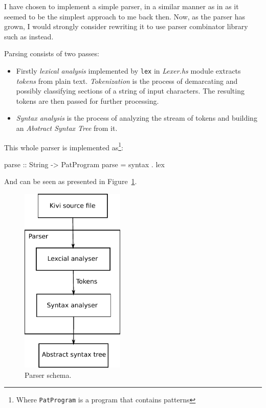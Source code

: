 \documentclass[12pt,a4paper]{report}
\begin{document}
I have chosen to implement a simple parser, in a similar manner as in
\cite{JonLes00} as it seemed to be the simplest approach to me back then. Now, as
the parser has grown, I would strongly consider rewriting it to use parser
combinator library such as \cite{website:parsec} instead.

Parsing consists of two passes:

\begin{itemize}
  \item Firstly \textit{lexical analysis} implemented by \texttt{lex} in
    \textit{Lexer.hs} module extracts \textit{tokens} from plain text.
    \textit{Tokenization} is the process of demarcating and possibly
    classifying sections of a string of input characters. The resulting tokens
    are then passed for further processing.
  \item \textit{Syntax analysis} is the process of analyzing the stream of
    tokens and building an \textit{Abstract Syntax Tree} from it.
\end{itemize}

This whole parser is implemented as\footnote{Where \texttt{PatProgram} is a
program that contains patterns}:

\vspace*{0.2in}
\begin{code}[style=haskell]
parse :: String -> PatProgram
parse = syntax . lex
\end{code}

And can be seen as presented in Figure~\ref{fig:parser}.

\vspace*{0.2in}
\begin{figure}[h!]
  \centering
  \includegraphics[height=9cm]{parser}
  \caption{Parser schema.}
  \label{fig:parser}
\end{figure}
\end{document}

